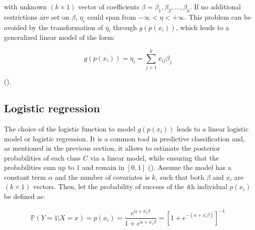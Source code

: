 with unknown $(k \times 1)$ vector of coefficients $\beta = \beta_1, \beta_2, \dots, \beta_k$. If no additional restrictions are set on $\beta$, $\eta_i$ could span from $-\infty < \eta < +\infty$. This problem can be avoided by the transformation of $\eta_i$ through $g(p(x_i))$, which leads to a generalized linear model of the form:

\begin{equation}
    g(p(x_i)) = \eta_i = \sum_{j=1}^{k} x_{ij} \beta_{j}
    \label{eqn:glm}
\end{equation}

(\cite{mccullagh1989}). 




\subsection{Logistic regression}
\label{sec:logit}

The choice of the logistic function to model $g(p(x_i))$ leads to a linear logistic model or logistic regression. It is a common tool in predictive classification and, as mentioned in the previous section, it allows to estimate the posterior probabilities of each class $C$ via a linear model, while ensuring that the probabilities sum up to $1$ and remain in $[0,1]$ (\cite{hastie2009elements}). Assume the model has a constant term $\alpha$ and the number of covariates is $k$, such that both $\beta$ and $x_i$ are $(k \times 1)$ vectors. Then, let the probability of success of the \textit{i}th individual $p(x_i)$ be defined as: 

\begin{equation}
    \mathbb{P}(Y=1 | X=x)=p(x_i) = \frac{e^{\alpha + x_i^\prime \beta}}{1 + e^{\alpha + x_i^\prime \beta}} = \left[1 + e^{-(\alpha + x_i^\prime \beta)}\right]^{-1}
    \label{eqn:basic-prob}
\end{equation}

